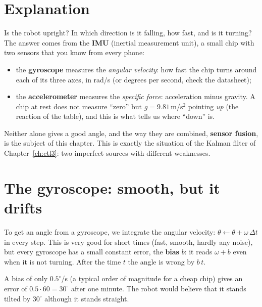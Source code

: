 \label{ch:ctl4}

\section*{Explanation}
Is the robot upright? In which direction is it falling, how fast, and is it turning? The answer comes from the \textbf{IMU} (inertial measurement unit), a small chip with two sensors that you know from every phone:
\begin{itemize}[nosep]
  \item the \textbf{gyroscope} measures the \emph{angular velocity}: how fast the chip turns around each of its three axes, in rad/s (or degrees per second, check the datasheet);
  \item the \textbf{accelerometer} measures the \emph{specific force}: acceleration minus gravity. A chip at rest does not measure ``zero'' but $g=9.81$\,m/s$^2$ pointing \emph{up} (the reaction of the table), and this is what tells us where ``down'' is.
\end{itemize}
Neither alone gives a good angle, and the way they are combined, \textbf{sensor fusion}, is the subject of this chapter. This is exactly the situation of the Kalman filter of Chapter~\ref{ch:ctl3}: two imperfect sources with different weaknesses.

\section*{The gyroscope: smooth, but it drifts}
To get an angle from a gyroscope, we integrate the angular velocity: $\theta\leftarrow\theta+\omega\,\Delta t$ in every step. This is very good for short times (fast, smooth, hardly any noise), but every gyroscope has a small constant error, the \textbf{bias} $b$: it reads $\omega+b$ even when it is not turning. After the time $t$ the angle is wrong by $b\,t$.

\begin{example}
A bias of only $0.5^{\circ}$/s (a typical order of magnitude for a cheap chip) gives an error of $0.5\cdot60=30^{\circ}$ after one minute. The robot would believe that it stands tilted by $30^{\circ}$ although it stands straight.
\end{example}

